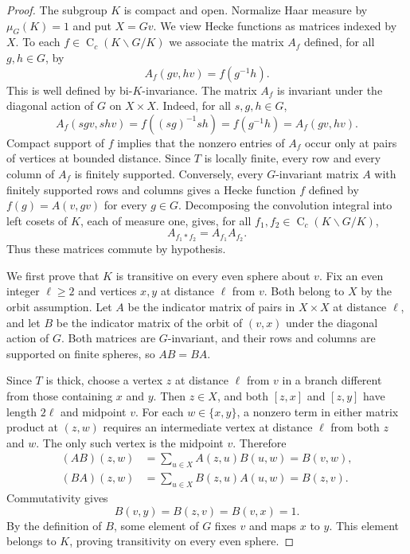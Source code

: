 \documentclass[11pt]{amsart}
\numberwithin{equation}{section}
\newcommand{\rC}{\operatorname{C}}
\newcommand{\Hk}[2]{\rC_c(#2\backslash #1/#2)}
\theoremstyle{definition}
\begin{document}
\begin{proof}
    The subgroup $K$ is compact and open. Normalize Haar measure by $\mu_G(K)=1$ and put $X=Gv$. We view Hecke functions as matrices indexed by $X$. To each $f\in\Hk GK$ we associate the matrix $A_f$ defined, for all $g,h\in G$, by
    $$
        A_f(gv,hv)=f(g^{-1}h).
    $$
    This is well defined by bi-$K$-invariance. The matrix $A_f$ is invariant under the diagonal action of $G$ on $X\times X$. Indeed, for all $s,g,h\in G$,
    $$
        A_f(sgv,shv)=f((sg)^{-1}sh)=f(g^{-1}h)=A_f(gv,hv).
    $$
    Compact support of $f$ implies that the nonzero entries of $A_f$ occur only at pairs of vertices at bounded distance. Since $T$ is locally finite, every row and every column of $A_f$ is finitely supported. Conversely, every $G$-invariant matrix $A$ with finitely supported rows and columns gives a Hecke function $f$ defined by $f(g)=A(v,gv)$ for every $g\in G$. Decomposing the convolution integral into left cosets of $K$, each of measure one, gives, for all $f_1,f_2\in\Hk GK$,
    $$
        A_{f_1\ast f_2}=A_{f_1}A_{f_2}.
    $$
    Thus these matrices commute by hypothesis.

    We first prove that $K$ is transitive on every even sphere about $v$. Fix an even integer $\ell\geq2$ and vertices $x,y$ at distance $\ell$ from $v$. Both belong to $X$ by the orbit assumption. Let $A$ be the indicator matrix of pairs in $X\times X$ at distance $\ell$, and let $B$ be the indicator matrix of the orbit of $(v,x)$ under the diagonal action of $G$. Both matrices are $G$-invariant, and their rows and columns are supported on finite spheres, so $AB=BA$.

    Since $T$ is thick, choose a vertex $z$ at distance $\ell$ from $v$ in a branch different from those containing $x$ and $y$. Then $z\in X$, and both $[z,x]$ and $[z,y]$ have length $2\ell$ and midpoint $v$. For each $w\in\{x,y\}$, a nonzero term in either matrix product at $(z,w)$ requires an intermediate vertex at distance $\ell$ from both $z$ and $w$. The only such vertex is the midpoint $v$. Therefore
    $$
        \begin{aligned}
            (AB)(z,w)&=\sum_{u\in X}A(z,u)B(u,w)=B(v,w),\\
            (BA)(z,w)&=\sum_{u\in X}B(z,u)A(u,w)=B(z,v).
        \end{aligned}
    $$
    Commutativity gives
    $$
        B(v,y)=B(z,v)=B(v,x)=1.
    $$
    By the definition of $B$, some element of $G$ fixes $v$ and maps $x$ to $y$. This element belongs to $K$, proving transitivity on every even sphere.


\end{proof}
\end{document}
